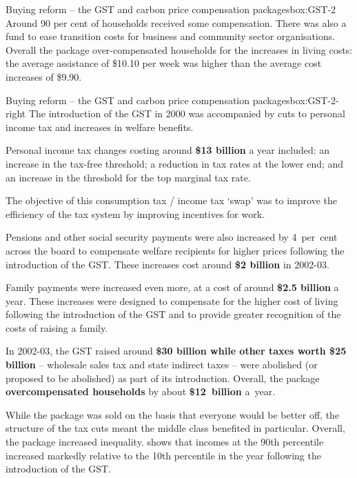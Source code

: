 {\begin{lultrabox}{Buying reform -- the GST and carbon price compensation packages}{box:GST-2}
Around 90 per cent of households received some compensation. There was also a fund to ease transition costs for business and community sector organisations. Overall the package over-compensated households for the increases in living costs: the average assistance of \$10.10 per week was higher than the average cost increases of \$9.90. 


\end{lultrabox}
\begin{rultrabox}{Buying reform -- the GST and carbon price compensation packages}{box:GST-2-right}
The introduction of the GST in 2000 was accompanied by cuts to personal income tax and increases in welfare benefits.

Personal income tax changes costing around \textbf{\$13 billion} a year included: an increase in the tax-free threshold; a reduction in tax rates at the lower end; and an increase in the threshold for the top marginal tax rate. 

The objective of this consumption tax / income tax ‘swap’ was to improve the efficiency of the tax system by improving incentives for work.

Pensions and other social security payments were also increased by 4~per~cent across the board to compensate welfare recipients for higher prices following the introduction of the GST\@. These increases cost around \textbf{\$2 billion} in 2002-03. 

Family payments were increased even more, at a cost of around \textbf{\$2.5 billion} a year. These increases were designed to compensate for the higher cost of living following the introduction of the GST and to provide greater recognition of the costs of raising a family. 

In 2002-03, the GST raised around \textbf{\$30 billion while other taxes worth \$25 billion} – wholesale sales tax and state indirect taxes – were abolished (or proposed to be abolished) as part of its introduction. Overall, the package \textbf{overcompensated households} by about \textbf{\$12~billion} a~year.

While the package was sold on the basis that everyone would be better off, the structure of the tax cuts meant the middle class benefited in particular. Overall, the package increased inequality. \textcite{Saunders2004} shows that incomes at the 90th percentile increased markedly relative to the 10th percentile in the year following the introduction of the GST.


\end{rultrabox}}
